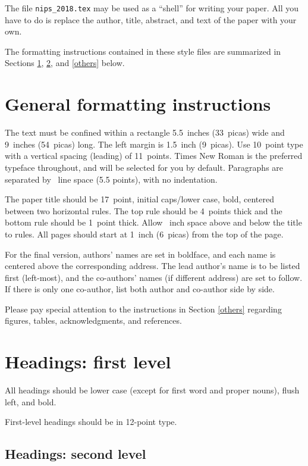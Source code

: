 \documentclass{article}
\begin{document}
The file \verb+nips_2018.tex+ may be used as a ``shell'' for writing
your paper. All you have to do is replace the author, title, abstract,
and text of the paper with your own.

The formatting instructions contained in these style files are
summarized in Sections \ref{gen_inst}, \ref{headings}, and
\ref{others} below.

\section{General formatting instructions}
\label{gen_inst}

The text must be confined within a rectangle 5.5~inches (33~picas)
wide and 9~inches (54~picas) long. The left margin is 1.5~inch
(9~picas).  Use 10~point type with a vertical spacing (leading) of
11~points.  Times New Roman is the preferred typeface throughout, and
will be selected for you by default.  Paragraphs are separated by
~line space (5.5 points), with no indentation.

The paper title should be 17~point, initial caps/lower case, bold,
centered between two horizontal rules. The top rule should be 4~points
thick and the bottom rule should be 1~point thick. Allow
~inch space above and below the title to rules. All
pages should start at 1~inch (6~picas) from the top of the page.

For the final version, authors' names are set in boldface, and each
name is centered above the corresponding address. The lead author's
name is to be listed first (left-most), and the co-authors' names (if
different address) are set to follow. If there is only one co-author,
list both author and co-author side by side.

Please pay special attention to the instructions in Section \ref{others}
regarding figures, tables, acknowledgments, and references.


\section{Headings: first level}
\label{headings}

All headings should be lower case (except for first word and proper
nouns), flush left, and bold.

First-level headings should be in 12-point type.

\subsection{Headings: second level}
\end{document}
